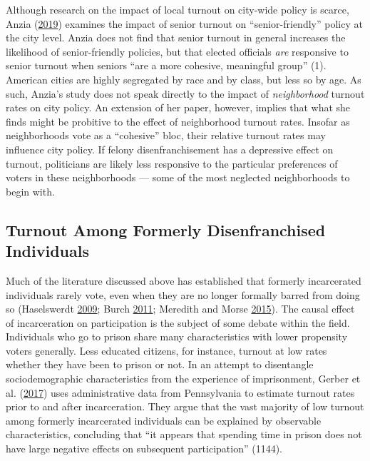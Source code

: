 \documentclass[]{article}
\begin{document}
Although research on the impact of local turnout on city-wide policy is scarce, Anzia (\protect\hyperlink{ref-Anzia2019}{2019}) examines the impact of senior turnout on ``senior-friendly'' policy at the city level. Anzia does not find that senior turnout in general increases the likelihood of senior-friendly policies, but that elected officials \emph{are} responsive to senior turnout when seniors ``are a more cohesive, meaningful group'' (1). American cities are highly segregated by race and by class, but less so by age. As such, Anzia's study does not speak directly to the impact of \emph{neighborhood} turnout rates on city policy. An extension of her paper, however, implies that what she finds might be probitive to the effect of neighborhood turnout rates. Insofar as neighborhoods vote as a ``cohesive'' bloc, their relative turnout rates may influence city policy. If felony disenfranchisement has a depressive effect on turnout, politicians are likely less responsive to the particular preferences of voters in these neighborhoods --- some of the most neglected neighborhoods to begin with.

\hypertarget{turnout-among-formerly-disenfranchised-individuals}{%
\subsection*{Turnout Among Formerly Disenfranchised Individuals}\label{turnout-among-formerly-disenfranchised-individuals}}

Much of the literature discussed above has established that formerly incarcerated individuals rarely vote, even when they are no longer formally barred from doing so (Haselswerdt \protect\hyperlink{ref-Haselswerdt2009}{2009}; Burch \protect\hyperlink{ref-Burch2011}{2011}; Meredith and Morse \protect\hyperlink{ref-Meredith2015}{2015}). The causal effect of incarceration on participation is the subject of some debate within the field. Individuals who go to prison share many characteristics with lower propensity voters generally. Less educated citizens, for instance, turnout at low rates whether they have been to prison or not. In an attempt to disentangle sociodemographic characteristics from the experience of imprisonment, Gerber et al. (\protect\hyperlink{ref-Gerber2017}{2017}) uses administrative data from Pennsylvania to estimate turnout rates prior to and after incarceration. They argue that the vast majority of low turnout among formerly incarcerated individuals can be explained by observable characteristics, concluding that ``it appears that spending time in prison does not have large negative effects on subsequent participation'' (1144).
\end{document}
